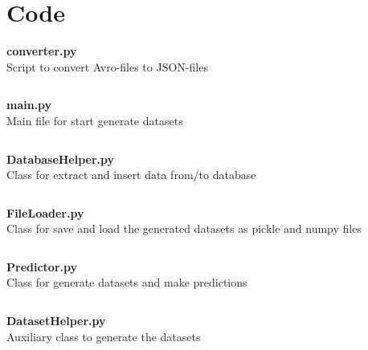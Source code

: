 \chapter{Code}

\textbf{\Large converter.py}\\

Script to convert Avro-files to JSON-files
\inputminted[mathescape,
               linenos,
               numbersep=5pt,
               gobble=2,
               frame=lines,
               framesep=2mm]{python}{../tools/scripts/converter.py}

\newpage

\textbf{\Large main.py}\\

Main file for start generate datasets
\inputminted[mathescape,
               linenos,
               numbersep=5pt,
               gobble=2,
               frame=lines,
               framesep=2mm]{python}{../tools/main.py}

\newpage
\textbf{\Large DatabaseHelper.py}\\

Class for extract and insert data from/to database 
\inputminted[mathescape,
               linenos,
               numbersep=5pt,
               gobble=2,
               frame=lines,
               framesep=2mm]{python}{../tools/DatasetHelper.py}

\newpage
\textbf{\Large FileLoader.py}\\

Class for save and load the generated datasets as pickle and numpy files 
\inputminted[mathescape,
               linenos,
               numbersep=5pt,
               gobble=2,
               frame=lines,
               framesep=2mm]{python}{../tools/FileLoader.py}

\newpage
\textbf{\Large Predictor.py}\\

Class for generate datasets and make predictions
\inputminted[mathescape,
               linenos,
               numbersep=5pt,
               gobble=2,
               frame=lines,
               framesep=2mm]{python}{../tools/Predictor.py}

\newpage
\textbf{\Large DatasetHelper.py}\\

Auxiliary class to generate the datasets
\inputminted[mathescape,
               linenos,
               numbersep=5pt,
               gobble=2,
               frame=lines,
               framesep=2mm]{python}{../tools/DatasetHelper.py}

